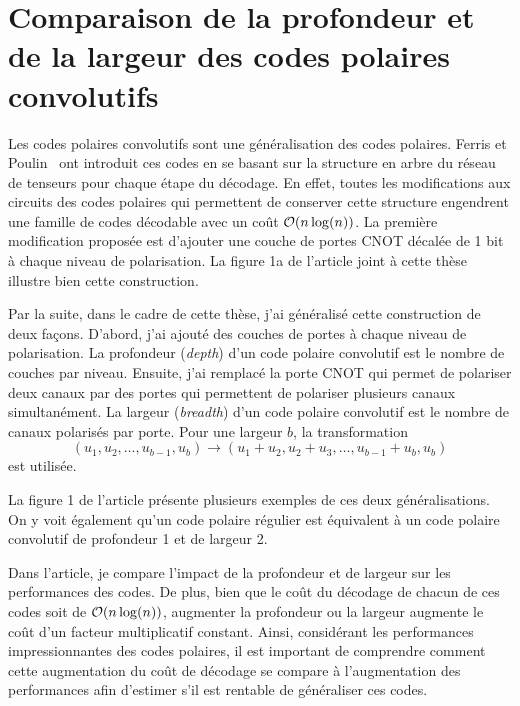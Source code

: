 \section{Comparaison de la profondeur et de la largeur des codes polaires convolutifs}

Les codes polaires convolutifs sont une généralisation des codes polaires.
Ferris et Poulin~\cite{ferris_branching_2014} ont introduit ces codes
en se basant sur la structure en arbre du réseau de tenseurs pour 
chaque étape du décodage.
En effet, 
toutes les modifications aux circuits des codes polaires qui permettent
de conserver cette structure engendrent une famille de codes décodable
avec un coût $\mathcal{O}(n \log(n))$.
La première modification proposée est d'ajouter 
une couche de portes CNOT décalée de 1 bit à chaque niveau de polarisation.
La figure 1a de l'article joint à cette thèse illustre bien cette construction.

Par la suite,
dans le cadre de cette thèse,
j'ai généralisé cette construction de deux façons.
D'abord,
j'ai ajouté des couches de portes à chaque niveau de polarisation.
La profondeur (\textit{depth}) d'un code polaire convolutif est
le nombre de couches par niveau.
Ensuite, j'ai remplacé la porte CNOT qui
permet de polariser deux canaux par des portes qui permettent de polariser plusieurs 
canaux simultanément.
La largeur (\textit{breadth}) d'un code polaire convolutif est le nombre de
canaux polarisés par porte.
Pour une largeur $b$, 
la transformation
\begin{equation}
  (u_1, u_2, \ldots, u_{b-1}, u_b) 
  \to 
  (u_1 + u_2, u_2 + u_3, \ldots, u_{b-1} + u_b, u_b) 
\end{equation}
est utilisée.

La figure 1 de l'article présente plusieurs exemples de ces deux généralisations.
On y voit également qu'un code polaire régulier est équivalent à un code polaire convolutif
de profondeur 1 et de largeur 2.

Dans l'article,
je compare l'impact de la profondeur et de largeur sur les performances des codes.
De plus, 
bien que le coût du décodage de chacun de ces codes soit de $\mathcal{O}(n \log(n))$,
augmenter la profondeur ou la largeur augmente le coût d'un facteur multiplicatif constant.
Ainsi,
considérant les performances impressionnantes des codes polaires,
il est important de comprendre comment cette augmentation du coût de décodage 
se compare à l'augmentation des performances
afin d'estimer s'il est rentable de généraliser ces codes.

